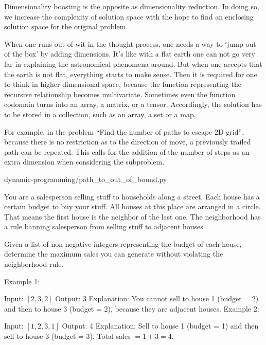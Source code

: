 Dimensionality boosting is the opposite as dimensionality reduction.
In doing so, we increase the complexity of solution space with the hope to find an enclosing
solution space for the original problem.

When one runs out of wit in the thought process, one needs a way to `jump out of the
box' by adding dimensions.
It's like with a flat earth one can not go very far in explaining the astronomical phenomena
around.
But when one accepts that the earth is not flat, everything starts to make sense.
Then it is required for one to think in higher dimensional space, because the function
representing the recursive relationship becomes multivariate.
Sometimes even the function codomain turns into an array, a matrix, or a tensor.
Accordingly, the solution has to be stored in a collection, such as an array, a set or a map.

For example, in the problem ``Find the number of paths to escape $2$D grid'', because there is no
restriction as to the direction of move, a previously trailed path can be repeated.
This calls for the addition of the number of steps as an extra dimension when considering the
subproblem.

\begin{clisting}
    
    {dynamic-programming/path_to_out_of_bound.py}
\end{clisting}



You are a salesperson selling stuff to households along a street.
Each house has a certain budget to buy your stuff.
All houses at this place are arranged in a circle.
That means the first house is the neighbor of the last one.
The neighborhood has a rule banning salesperson from selling stuff to adjacent houses.

Given a list of non-negative integers representing the budget of each house, determine
the maximum sales you can generate without violating the neighborhood rule.

Example 1:

Input: $[2,3,2]$
Output: 3
Explanation: You cannot sell to house 1 (budget = 2) and then to house 3 (budget = 2),
because they are adjacent houses.
Example 2:

Input: $[1,2,3,1]$
Output: 4
Explanation: Sell to house 1 (budget = 1) and then sell to house 3 (budget = 3).
Total sales $= 1 + 3 = 4.$



